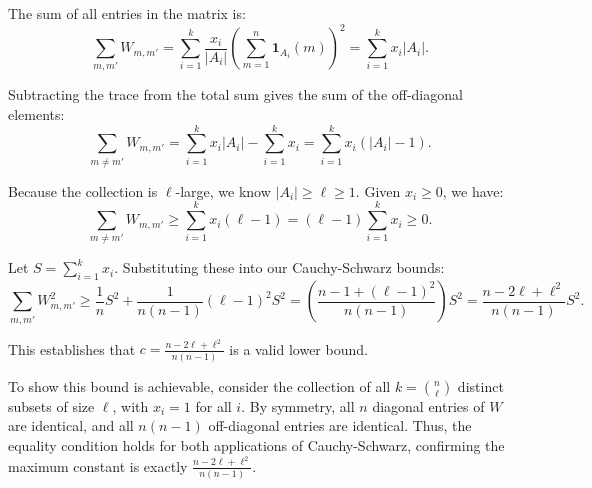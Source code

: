 \begin{enumerate}
 The sum of all entries in the matrix is:
 \[\sum_{m, m'} W_{m, m'} = \sum_{i=1}^k \frac{x_i}{|A_i|} \left( \sum_{m=1}^n \mathbf{1}_{A_i}(m) \right)^2 = \sum_{i=1}^k x_i |A_i|.\]

 Subtracting the trace from the total sum gives the sum of the off-diagonal elements:
 \[\sum_{m \neq m'} W_{m, m'} = \sum_{i=1}^k x_i |A_i| - \sum_{i=1}^k x_i = \sum_{i=1}^k x_i (|A_i| - 1).\]

 Because the collection is $\ell$-large, we know $|A_i| \geq \ell \geq 1$. Given $x_i \geq 0$, we have:
 \[\sum_{m \neq m'} W_{m, m'} \geq \sum_{i=1}^k x_i (\ell - 1) = (\ell - 1) \sum_{i=1}^k x_i \geq 0.\]

 Let $S = \sum_{i=1}^k x_i$. Substituting these into our Cauchy-Schwarz bounds:
 \[\sum_{m, m'} W_{m, m'}^2 \geq \frac{1}{n} S^2 + \frac{1}{n(n-1)} (\ell - 1)^2 S^2 = \left( \frac{n - 1 + (\ell - 1)^2}{n(n-1)} \right) S^2 = \frac{n - 2\ell + \ell^2}{n(n-1)} S^2.\]

 This establishes that $c = \frac{n - 2\ell + \ell^2}{n(n-1)}$ is a valid lower bound. 

 To show this bound is achievable, consider the collection of all $k = \binom{n}{\ell}$ distinct subsets of size $\ell$, with $x_i = 1$ for all $i$. By symmetry, all $n$ diagonal entries of $W$ are identical, and all $n(n-1)$ off-diagonal entries are identical. Thus, the equality condition holds for both applications of Cauchy-Schwarz, confirming the maximum constant is exactly $\frac{n - 2\ell + \ell^2}{n(n-1)}$.

 


\end{enumerate}